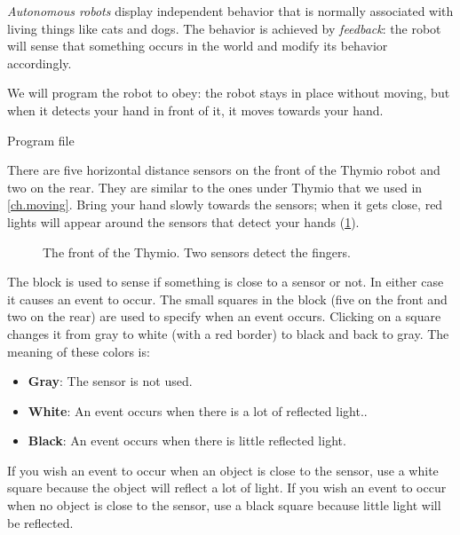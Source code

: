 
\label{ch.pet}

\emph{Autonomous robots} display independent behavior that is normally
associated with living things like cats and dogs. The behavior is
achieved by \textit{feedback}: the robot will sense that something
occurs in the world and modify its behavior accordingly.


We will program the robot to obey: the robot stays in place without
moving, but when it detects your hand in front of it, it moves towards
your hand.

{\raggedleft \hfill Program file }

There are five horizontal distance sensors on the front of the Thymio
robot and two on the rear. They are similar to the ones under Thymio
that we used in \cref{ch.moving}. Bring your hand slowly towards the
sensors; when it gets close, red lights will appear around the sensors
that detect your hands (\cref{fig.detect}).

\begin{figure}
\begin{center}
\caption{The front of the Thymio. Two sensors detect the fingers.}\label{fig.detect}
\end{center}
\end{figure}

The block  is used to sense if something is close to a
sensor or not. In either case it causes an event to occur. The small
squares in the block (five on the front and two on the rear) are used to
specify when an event occurs. Clicking on a square changes it from gray
to white (with a red border) to black and back to gray. The meaning of
these colors is:

\begin{itemize}
\item \textbf{Gray}: The sensor is not used.
\item \textbf{White}: An event occurs when there is a lot of reflected
light.\label{p.proximity-colors2}.
\item \textbf{Black}: An event occurs when there is little reflected
light.
\end{itemize}

If you wish an event to occur when an object is close to the sensor, use
a white square because the object will reflect a lot of light. If you
wish an event to occur when no object is close to the sensor, use a
black square because little light will be reflected.

